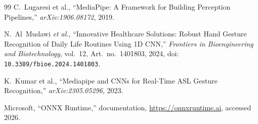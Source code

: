 \documentclass{llncs}
\begin{document}
\begin{thebibliography}{99}
C.~Lugaresi et al., ``MediaPipe: A Framework for Building Perception
Pipelines,'' \textit{arXiv:1906.08172}, 2019.

N.~Al~Mudawi \textit{et al.}, ``Innovative Healthcare Solutions: Robust
Hand Gesture Recognition of Daily Life Routines Using 1D CNN,''
\textit{Frontiers in Bioengineering and Biotechnology}, vol.~12,
Art.~no.~1401803, 2024, doi: \texttt{10.3389/fbioe.2024.1401803}.

K.~Kumar et al., ``Mediapipe and CNNs for Real-Time ASL Gesture
Recognition,'' \textit{arXiv:2305.05296}, 2023.

Microsoft, ``ONNX Runtime,'' documentation,
\url{https://onnxruntime.ai}, accessed 2026.

\end{thebibliography}
\end{document}
